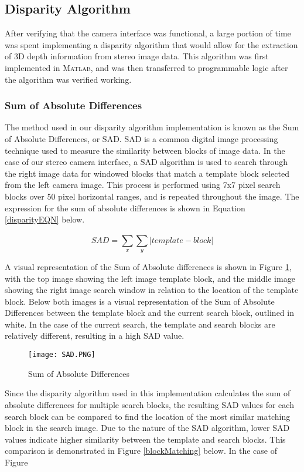 \subsection{Disparity Algorithm}
After verifying that the camera interface was functional, a large portion of time was spent implementing a disparity algorithm that would allow for the extraction of 3D depth information from stereo image data. This algorithm was first implemented in \textsc{Matlab}, and was then transferred to programmable logic after the algorithm was verified working. 
\subsubsection{Sum of Absolute Differences}
The method used in our disparity algorithm implementation is known as the Sum of Absolute Differences, or SAD. SAD is a common digital image processing technique used to measure the similarity between blocks of image data. In the case of our stereo camera interface, a SAD algorithm is used to search through the right image data for windowed blocks that match a template block selected from the left camera image. This process is performed using 7x7 pixel search blocks over 50 pixel horizontal ranges, and is repeated throughout the image. The expression for the sum of absolute differences is shown in Equation \ref{disparityEQN} below. 
\par
\begin{equation}\label{disparityEQN}
SAD = \sum_{x}^{}\sum_{y}^{}|template-block|
\end{equation}
\par
A visual representation of the Sum of Absolute differences is shown in Figure \ref{SAD}, with the top image showing the left image template block, and the middle image showing the right image search window in relation to the location of the template block. Below both images is a visual representation of the Sum of Absolute Differences between the template block and the current search block, outlined in white. In the case of the current search, the template and search blocks are relatively different, resulting in a high SAD value. 
\par
\begin{figure}[H]
	\centerline{\texttt{[image: SAD.PNG]}}
	\caption{Sum of Absolute Differences \cite{mccormick}}
	\label{SAD}
\end{figure}
\par
Since the disparity algorithm used in this implementation calculates the sum of absolute differences for multiple search blocks, the resulting SAD values for each search block can be compared to find the location of the most similar matching block in the search image. Due to the nature of the SAD algorithm, lower SAD values indicate higher similarity between the template and search blocks. This comparison is demonstrated in Figure \ref{blockMatching} below. In the case of Figure 
